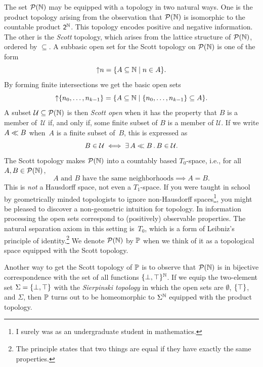 The set $\mathcal{P}(\mathbb{N})$ may be equipped with a topology in two natural
ways. One is the product topology arising from the observation that
$\mathcal{P}(\mathbb{N})$ is isomorphic to the countable product $\mathsf{2}^{\mathbb{N}}$. This
topology encodes positive and negative information. The other is the
\emph{Scott} topology, which arises from the lattice structure of
$\mathcal{P}(\mathbb{N})$, ordered by $\subseteq$. A subbasic open set for the Scott
topology on $\mathcal{P}(\mathbb{N})$ is one of the form
%
\begin{equation*}
  {\uparrow}n = \{A \subseteq \mathbb{N} \mid n \in A\}.
\end{equation*}
%
By forming finite intersections we get the basic open sets
%
\begin{equation*}
  {\uparrow}\{n_0, \ldots, n_{k-1}\} =
  \{A \subseteq \mathbb{N} \mid \{n_0, \ldots, n_{k-1}\} \subseteq A\}.
\end{equation*}
%
A subset $\mathcal{U} \subseteq \mathcal{P}(\mathbb{N})$ is then \emph{Scott open}
when it has the property that $B$ is a member of~$\mathcal{U}$ if, and
only if, some finite subset of $B$ is a member of $\mathcal{U}$. If we
write $A \ll B$ when~$A$ is a finite subset of~$B$, this is
expressed as
%
\begin{equation*}
  B \in \mathcal{U} \iff \exists\, A \ll B\,.\,B \in \mathcal{U}.
\end{equation*}
%
The Scott topology makes $\mathcal{P}(\mathbb{N})$ into a countably based
$T_0$-space, i.e., for all $A, B \in \mathcal{P}(\mathbb{N})$,
%
\begin{equation*}
  \text{$A$ and $B$ have the same neighborhoods} \implies A = B.
\end{equation*}
%
This is \emph{not} a Hausdorff space, not even a $T_1$-space. If you
were taught in school by geometrically minded topologists to ignore
non-Hausdorff spaces\footnote{I surely was as an undergraduate student
  in mathematics.}, you might be pleased to discover a non-geometric
intuition for topology. In information processing the open sets
correspond to (positively) observable properties. The natural
separation axiom in this setting is~$T_0$, which is a form of
Leibniz's principle of identity.\footnote{The principle states that
  two things are equal if they have exactly the same properties.} We
denote $\mathcal{P}(\mathbb{N})$ by $\mathbb{P}$ when we think of it as a topological
space equipped with the Scott topology.

Another way to get the Scott topology of $\mathbb{P}$ is to observe that
$\mathcal{P}(\mathbb{N})$ is in bijective correspondence with the set of all
functions $\{\bot, \top\}^{\mathbb{N}}$. If we equip the two-element set
$\Sigma = \{\bot, \top\}$ with the \emph{Sierpinski topology} in
which the open sets are $\emptyset$, $\{\top\}$, and $\Sigma$, then
$\mathbb{P}$ turns out to be homeomorphic to $\Sigma^{\mathbb{N}}$ equipped with
the product topology.


